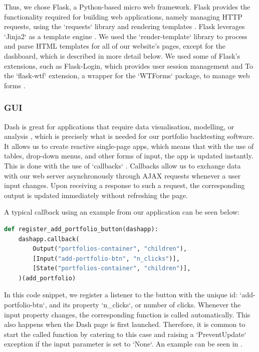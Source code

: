 \documentclass[main.tex]{subfiles}
\begin{document}
Thus, we chose Flask, a Python-based micro web framework. Flask provides the functionality required for building web applications, namely managing HTTP requests, using the `requests` library and rendering templates \cite{smyth_2018}. Flask leverages `Jinja2` as a template engine \cite{templates_2010}. We used the `render-template` library to process and parse HTML templates for all of our website's pages, except for the dashboard, which is described in more detail below. We used some of Flask's extensions, such as Flask-Login, which provides user session management\cite{flask-login} and To the `flask-wtf` extension, a wrapper for the `WTForms` package, to manage web forms \cite{wtforms-documentation}.

\subsubsection{GUI}
\label{GUI}

Dash is great for applications that require data visualisation, modelling, or analysis \cite{dash}, which is precisely what is needed for our portfolio backtesting software. It allows us to create reactive single-page apps, which means that with the use of tables, drop-down menus, and other forms of input, the app is updated instantly. This is done with the use of `callbacks` \cite{callbacks}. Callbacks allow us to exchange data with our web server asynchronously through AJAX requests whenever a user input changes. Upon receiving a response to such a request, the corresponding output is updated immediately without refreshing the page.

A typical callback using an example from our application can be seen below:

\begin{lstlisting}[language=Python, caption=setup.py - Development environment, label=lst:callback_example]
def register_add_portfolio_button(dashapp):
    dashapp.callback(
        Output("portfolios-container", "children"),
        [Input("add-portfolio-btn", "n_clicks")],
        [State("portfolios-container", "children")],
    )(add_portfolio)
\end{lstlisting}


In this code snippet, we register a listener to the button with the unique id: `add-portfolio-btn`, and its property `n\_clicks`, or number of clicks. Whenever the input property changes, the corresponding function is called automatically. This also happens when the Dash page is first launched. Therefore, it is common to start the called function by catering to this case and raising a `PreventUpdate` exception if the input parameter is set to `None`. An example can be seen in \cite{prevent_update}.
\end{document}

